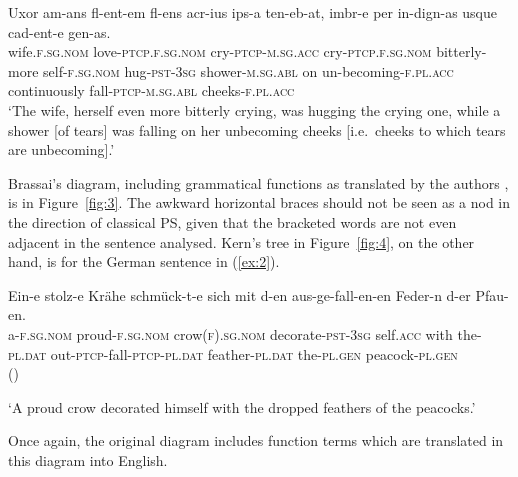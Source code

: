 \documentclass[output=paper
 	        ,biblatex
                ,babelshorthands
                ,newtxmath
                ,draftmode
                ,colorlinks, citecolor=brown
]{langscibook}
\begin{document}
\ea
\label{ex:1}
\gll Uxor am-ans fl-ent-em fl-ens acr-ius ips-a ten-eb-at, imbr-e per in-dign-as usque cad-ent-e gen-as.\\
     wife\textsc{.f.sg.nom} love\textsc{-ptcp.f.sg.nom} cry\textsc{-ptcp-m.sg.acc} cry\textsc{-ptcp.f.sg.nom} bitterly-more self\textsc{-f.sg.nom} hug\textsc{-pst-3sg} shower\textsc{-m.sg.abl} on un-becoming\textsc{-f.pl.acc} continuously fall\textsc{-ptcp-m.sg.abl} cheeks\textsc{-f.pl.acc}\\
	\glt `The wife, herself even more bitterly crying, was hugging the crying one, while a shower [of tears] was falling on her unbecoming cheeks [i.e.\ cheeks to which tears are unbecoming].'
\z

Brassai's diagram, including grammatical functions as translated by the authors
\citep{ImrenyiVladar2020a-u}, is in Figure~\ref{fig:3}. The awkward horizontal braces should not be seen
as a nod in the direction of classical PS, given that the bracketed words are not even adjacent in
the sentence analysed. Kern's tree in Figure~\ref{fig:4}, on the other hand, is for the German
sentence in (\ref{ex:2}).

\ea
\label{ex:2}
\gll Ein-e               stolz-e                 Krähe                            schmück-t-e sich mit d-en aus-ge-fall-en-en Feder-n d-er Pfau-en.\\
     a\textsc{-f.sg.nom} proud\textsc{-f.sg.nom} crow(\textsc{f})\textsc{.sg.nom} decorate\textsc{-pst}\textsc{-3sg} self\textsc{.acc} with the\textsc{-pl.dat} out-\textsc{ptcp}-fall-\textsc{ptcp}-\textsc{pl.dat} feather\textsc{-pl.dat} the\textsc{-pl.gen} peacock-\textsc{pl.gen}\\\hfill()

\glt `A proud crow decorated himself with the dropped feathers of the peacocks.'
\z

Once again, the original diagram includes function terms which are translated in this diagram into English.
\end{document}
